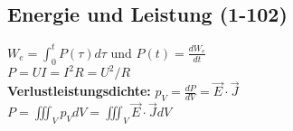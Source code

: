 \documentclass[a4paper, 11pt]{scrartcl}
\begin{document}
				\subsection{Energie und Leistung (1-102)}
				$\displaystyle{W_e=\int_{0}^{t}{P(\tau)}d\tau}$ und $P(t)=\frac{dW_e}{dt}$\\$P=UI=I^2R=U^2/R$\\
				\textbf{Verlustleistungsdichte:} $p_V=\frac{dP}{dV}=\vec{E}\cdot\vec{J}$\\
				$P=\iiint_V{p_V}dV=\iiint_V{\vec{E}\cdot\vec{J}}dV$
			
\setcounter{secnumdepth}{2}
\end{document}
